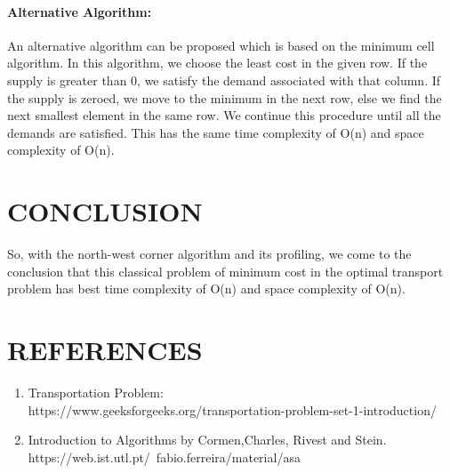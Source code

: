 \documentclass[10pt]{article}
\begin{document}
\begin{multicols*}{2}

\paragraph{Alternative Algorithm:}

An alternative algorithm can be proposed which is based on the minimum cell algorithm. In this algorithm, we choose the least cost in the given row. If the supply is greater than 0, we satisfy the demand associated with that column. If the supply is zeroed, we move to the minimum in the next row, else we find the next smallest element in the same row. We continue this procedure until all the demands are satisfied. This has the same time complexity of O(n) and space complexity of O(n).

\section*{CONCLUSION}

So, with the north-west corner algorithm and its profiling, we come to the conclusion that this classical problem of minimum cost in the optimal transport problem has best time complexity of O(n) and space complexity of O(n).

\section*{REFERENCES}

\begin{enumerate}
\item Transportation Problem:\\
https://www.geeksforgeeks.org/transportation-problem-set-1-introduction/
\item Introduction to Algorithms by Cormen,Charles, Rivest and Stein.\\
https://web.ist.utl.pt/~fabio.ferreira/material/asa
\end{enumerate}\\


\end{multicols*}
\end{document}

